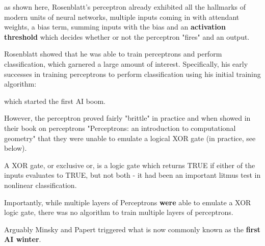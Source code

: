 
as shown here, Rosenblatt's perceptron already exhibited all the hallmarks of modern units of neural networks, multiple inputs coming in with attendant weights, a bias term, summing inputs with the bias and an \textbf{activation threshold} which decides whether or not the perceptron "fires" and an output.

\pagebreak

Rosenblatt showed that he was able to train perceptrons and perform classification, which garnered a large amount of interest. Specifically, his early successes in training perceptrons to perform classification using his initial training algorithm:


which started the first \ac{AI} boom.

However, the perceptron proved fairly "brittle" in practice and when \cite{minsky} showed in their book on perceptrons "Perceptrons: an introduction to computational geometry" that they were unable to emulate a logical XOR gate (in practice, see below). 

\pagebreak

A XOR gate, or exclusive or, is a logic gate which returns TRUE if either of the inputs evaluates to TRUE, but not both - it had been an important litmus test in nonlinear classification. 

Importantly, while multiple layers of Perceptrons \textbf{were} able to emulate a XOR logic gate, there was no algorithm to train multiple layers of perceptrons.

Arguably Minsky and Papert triggered what is now commonly known as the \textbf{first \ac{AI} winter}.
